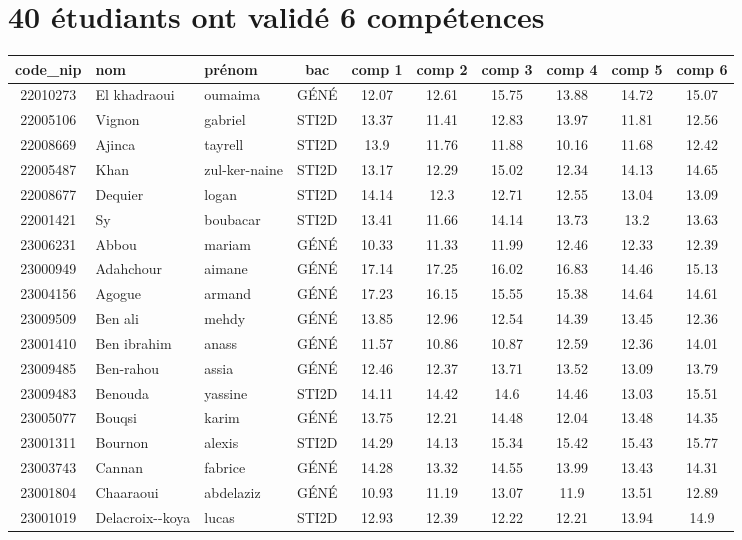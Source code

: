 \documentclass{article}%
\begin{document}
%
\normalsize%
\pagestyle{header}%
\section*{40 étudiants ont validé 6 compétences}%
\label{sec:40tudiantsontvalid6comptences}%
\begin{tabular}{|c|l|l|c|c|c|c|c|c|c|}%
\hline%
\rowcolor{jaune}%
code\_nip&nom&prénom&bac&comp 1&comp 2&comp 3&comp 4&comp 5&comp 6\\%
\hline%
22010273&El khadraoui&oumaima&GÉNÉ&12.07&12.61&15.75&13.88&14.72&15.07\\%
\hline%
22005106&Vignon&gabriel&STI2D&13.37&11.41&12.83&13.97&11.81&12.56\\%
\hline%
22008669&Ajinca&tayrell&STI2D&13.9&11.76&11.88&10.16&11.68&12.42\\%
\hline%
22005487&Khan&zul{-}ker{-}naine&STI2D&13.17&12.29&15.02&12.34&14.13&14.65\\%
\hline%
22008677&Dequier&logan&STI2D&14.14&12.3&12.71&12.55&13.04&13.09\\%
\hline%
22001421&Sy&boubacar&STI2D&13.41&11.66&14.14&13.73&13.2&13.63\\%
\hline%
23006231&Abbou&mariam&GÉNÉ&10.33&11.33&11.99&12.46&12.33&12.39\\%
\hline%
23000949&Adahchour&aimane&GÉNÉ&17.14&17.25&16.02&16.83&14.46&15.13\\%
\hline%
23004156&Agogue&armand&GÉNÉ&17.23&16.15&15.55&15.38&14.64&14.61\\%
\hline%
23009509&Ben ali&mehdy&GÉNÉ&13.85&12.96&12.54&14.39&13.45&12.36\\%
\hline%
23001410&Ben ibrahim&anass&GÉNÉ&11.57&10.86&10.87&12.59&12.36&14.01\\%
\hline%
23009485&Ben{-}rahou&assia&GÉNÉ&12.46&12.37&13.71&13.52&13.09&13.79\\%
\hline%
23009483&Benouda&yassine&STI2D&14.11&14.42&14.6&14.46&13.03&15.51\\%
\hline%
23005077&Bouqsi&karim&GÉNÉ&13.75&12.21&14.48&12.04&13.48&14.35\\%
\hline%
23001311&Bournon&alexis&STI2D&14.29&14.13&15.34&15.42&15.43&15.77\\%
\hline%
23003743&Cannan&fabrice&GÉNÉ&14.28&13.32&14.55&13.99&13.43&14.31\\%
\hline%
23001804&Chaaraoui&abdelaziz&GÉNÉ&10.93&11.19&13.07&11.9&13.51&12.89\\%
\hline%
23001019&Delacroix{-}{-}koya&lucas&STI2D&12.93&12.39&12.22&12.21&13.94&14.9\\%

\end{tabular}
\end{document}
